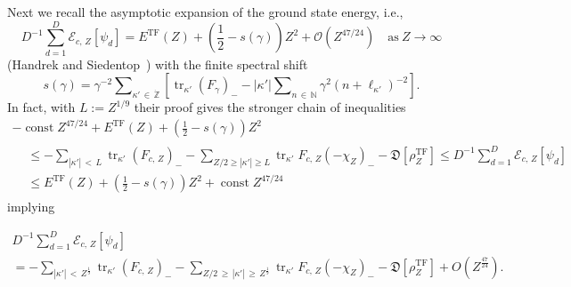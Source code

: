 \documentclass[10pt]{amsart}
\theoremstyle{definition}
\newcommand{\TF}{\mathrm{TF}}
\DeclareMathOperator{\tr}{tr}
\DeclareMathOperator{\const}{const}
\newcommand*\nz{\mathbb{N}}
\newcommand*\gz{\mathbb{Z}}
\newcommand*\zp{\dot{\gz}}
\newcommand*\cE{\mathcal{E}}
\newcommand*\cO{\mathcal{O}}
\newcommand*\gD{\mathfrak{D}}
\begin{document}
Next we recall the asymptotic expansion of the ground state energy, i.e.,
\[
D^{-1}\sum_{d=1}^D\cE_{c,\,Z}\left[\psi_d\right] = E^{\TF}(Z) + \left(\frac12-s(\gamma)\right)Z^2+\cO\left(Z^{47/24}\right)
\quad \text{as}\ Z\to\infty
\]
(Handrek and Siedentop~\cite[Theorem~1]{HandrekSiedentop2015}) with the finite spectral shift
\begin{equation}\label{eq:spectralshift}
s(\gamma) =\gamma^{-2}\sum\nolimits_{{\kappa'}\,\in\,\zp}\left[\tr_{\kappa'}\left(F_\gamma\right)_{-} - \left|{\kappa'}\right|\sum\nolimits_{n\,\in\,\nz}\gamma^2\left(n+\ell_{\kappa'}\right)^{-2}\right].
\end{equation}
In fact, with $L:=Z^{1/9}$ their proof gives the stronger chain of inequalities
\begin{multline}\label{scottoperator}
-\const Z^{47/24} + E^{\TF}(Z)+\left(\frac12-s(\gamma)\right)Z^2\\
\begin{aligned}
&\leq -\sum_{\left|{\kappa'}\right|\,<\,L}\tr_{\kappa'} \left(F_{c,\,Z}\right)_{-} - \sum_{Z/2\geq |{\kappa'}|\geq L}\tr_{\kappa'} F_{c,\,Z}\left(-\chi_Z\right)_{-} -\gD\left[\rho_Z^{\TF}\right]\leq D^{-1}\sum_{d=1}^D\cE_{c,\,Z}\left[\psi_d\right] \\
&\leq E^{\TF}(Z)+\left(\frac12-s(\gamma)\right)Z^2+\const Z^{47/24}
\end{aligned}
\end{multline}
implying

\begin{multline}\label{wichtig}
D^{-1}\sum_{d=1}^D\cE_{c,\,Z}\left[\psi_d\right]\\
= -\sum_{\left|{\kappa'}\right|\,<\,Z^\frac19}\tr_{\kappa'} \left(F_{c,\,Z}\right)_{-} - \sum_{Z/2\,\geq\,\left|{\kappa'}\right|\,\geq\,Z^\frac19}\tr_{\kappa'} F_{c,\,Z}\left(-\chi_Z\right)_{-} -
\gD\left[\rho_Z^{\TF}\right] + O\left(Z^\frac{47}{24}\right).
\end{multline}
\end{document}
